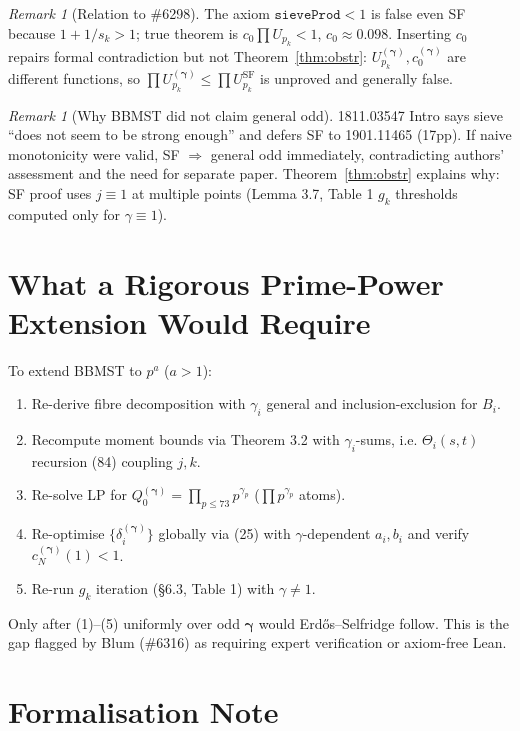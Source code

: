 \documentclass[11pt,a4paper]{article}
\theoremstyle{plain}
\theoremstyle{definition}
\theoremstyle{remark}
\newtheorem{remark}[theorem]{Remark}
\begin{document}
\begin{remark}[Relation to \#6298]
The axiom $\texttt{sieveProd}<1$ is false even SF because $1+1/s_{k}>1$; true theorem is $c_{0}\prod U_{p_{k}}<1$, $c_{0}\approx0.098$. Inserting $c_{0}$ repairs formal contradiction but not Theorem~\ref{thm:obstr}: $U_{p_{k}}^{(\boldsymbol\gamma)},c_{0}^{(\boldsymbol\gamma)}$ are different functions, so $\prod U_{p_{k}}^{(\boldsymbol\gamma)}\le\prod U_{p_{k}}^{\mathrm{SF}}$ is unproved and generally false.
\end{remark}

\begin{remark}[Why BBMST did not claim general odd]
1811.03547 Intro says sieve ``does not seem to be strong enough'' and defers SF to 1901.11465 (17pp). If naive monotonicity were valid, SF $\Rightarrow$ general odd immediately, contradicting authors' assessment and the need for separate paper. Theorem~\ref{thm:obstr} explains why: SF proof uses $j\equiv1$ at multiple points (Lemma 3.7, Table 1 $g_{k}$ thresholds computed only for $\gamma\equiv1$).
\end{remark}

\section{What a Rigorous Prime-Power Extension Would Require}

To extend BBMST to $p^{a}$ ($a>1$):
\begin{enumerate}
\item Re-derive fibre decomposition with $\gamma_{i}$ general and inclusion-exclusion for $B_{i}$.
\item Recompute moment bounds via Theorem 3.2 with $\gamma_{i}$-sums, i.e. $\Theta_{i}(s,t)$ recursion (84) coupling $j,k$.
\item Re-solve LP for $Q_{0}^{(\boldsymbol\gamma)}=\prod_{p\le73}p^{\gamma_{p}}$ ($\prod p^{\gamma_{p}}$ atoms).
\item Re-optimise $\{\delta_{i}^{(\boldsymbol\gamma)}\}$ globally via (25) with $\gamma$-dependent $a_{i},b_{i}$ and verify $c_{N}^{(\boldsymbol\gamma)}(1)<1$.
\item Re-run $g_{k}$ iteration (\S6.3, Table 1) with $\gamma\neq1$.
\end{enumerate}
Only after (1)--(5) uniformly over odd $\boldsymbol\gamma$ would Erd\H{o}s--Selfridge follow. This is the gap flagged by Blum (\#6316) as requiring expert verification or axiom-free Lean.

\section{Formalisation Note}
\end{document}

